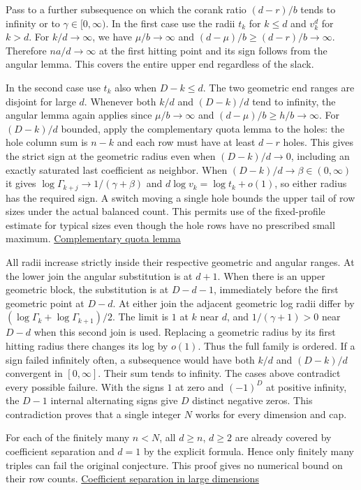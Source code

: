 Pass to a further subsequence on which the corank ratio $(d-r)/b$ tends to infinity or to $\gamma\in[0,\infty)$. In the first case use the radii $t_k$ for $k\le d$ and $v_k^d$ for $k>d$. For $k/d\to\infty$, we have $\mu/b\to\infty$ and $(d-\mu)/b\ge(d-r)/b\to\infty$. Therefore $na/d\to\infty$ at the first hitting point and its sign follows from the angular lemma. This covers the entire upper end regardless of the slack.

In the second case use $t_k$ also when $D-k\le d$. The two geometric end ranges are disjoint for large $d$. Whenever both $k/d$ and $(D-k)/d$ tend to infinity, the angular lemma again applies since $\mu/b\to\infty$ and $(d-\mu)/b\ge h/b\to\infty$. For $(D-k)/d$ bounded, apply the complementary quota lemma to the holes: the hole column sum is $n-k$ and each row must have at least $d-r$ holes. This gives the strict sign at the geometric radius even when $(D-k)/d\to0$, including an exactly saturated last coefficient as neighbor. When $(D-k)/d\to\beta\in(0,\infty)$ it gives $\log\Gamma_{k+j}\to1/(\gamma+\beta)$ and $d\log v_k=\log t_k+o(1)$, so either radius has the required sign. A switch moving a single hole bounds the upper tail of row sizes under the actual balanced count. This permits use of the fixed-profile estimate for typical sizes even though the hole rows have no prescribed small maximum. \hyperref[sec:sublinear-b-generic-upper-transfer]{Complementary quota lemma}

All radii increase strictly inside their respective geometric and angular ranges. At the lower join the angular substitution is at $d+1$. When there is an upper geometric block, the substitution is at $D-d-1$, immediately before the first geometric point at $D-d$. At either join the adjacent geometric log radii differ by $(\log\Gamma_k+\log\Gamma_{k+1})/2$. The limit is $1$ at $k$ near $d$, and $1/(\gamma+1)>0$ near $D-d$ when this second join is used. Replacing a geometric radius by its first hitting radius there changes its log by $o(1)$. Thus the full family is ordered. If a sign failed infinitely often, a subsequence would have both $k/d$ and $(D-k)/d$ convergent in $[0,\infty]$. Their sum tends to infinity. The cases above contradict every possible failure. With the signs $1$ at zero and $(-1)^D$ at positive infinity, the $D-1$ internal alternating signs give $D$ distinct negative zeros. This contradiction proves that a single integer $N$ works for every dimension and cap.

For each of the finitely many $n<N$, all $d\ge n$, $d\ge2$ are already covered by coefficient separation and $d=1$ by the explicit formula. Hence only finitely many triples can fail the original conjecture. This proof gives no numerical bound on their row counts. \href{https://github.com/ProgramComputer/open-math-research/blob/4fb624ba937a8eecc1361a6066185cd81ab7b172/topics/balanced-arrays/finite-linear-reduction.md}{Coefficient separation in large dimensions}
